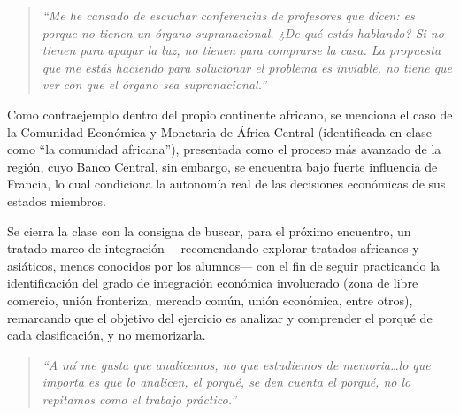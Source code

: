 \documentclass[12pt,oneside]{book}
\newenvironment{citadocente}
  {\begin{quote}\itshape\RaggedRight}
  {\end{quote}}
\begin{document}
\begin{citadocente}
``Me he cansado de escuchar conferencias de profesores que dicen: es porque no tienen un órgano supranacional. ¿De qué estás hablando? Si no tienen para apagar la luz, no tienen para comprarse la casa. La propuesta que me estás haciendo para solucionar el problema es inviable, no tiene que ver con que el órgano sea supranacional.''
\end{citadocente}

Como contraejemplo dentro del propio continente africano, se menciona el caso de la Comunidad Económica y Monetaria de África Central (identificada en clase como ``la comunidad africana''), presentada como el proceso más avanzado de la región, cuyo Banco Central, sin embargo, se encuentra bajo fuerte influencia de Francia, lo cual condiciona la autonomía real de las decisiones económicas de sus estados miembros.


Se cierra la clase con la consigna de buscar, para el próximo encuentro, un tratado marco de integración —recomendando explorar tratados africanos y asiáticos, menos conocidos por los alumnos— con el fin de seguir practicando la identificación del grado de integración económica involucrado (zona de libre comercio, unión fronteriza, mercado común, unión económica, entre otros), remarcando que el objetivo del ejercicio es analizar y comprender el porqué de cada clasificación, y no memorizarla.

\begin{citadocente}
``A mí me gusta que analicemos, no que estudiemos de memoria\ldots lo que importa es que lo analicen, el porqué, se den cuenta el porqué, no lo repitamos como el trabajo práctico.''
\end{citadocente}
\end{document}
